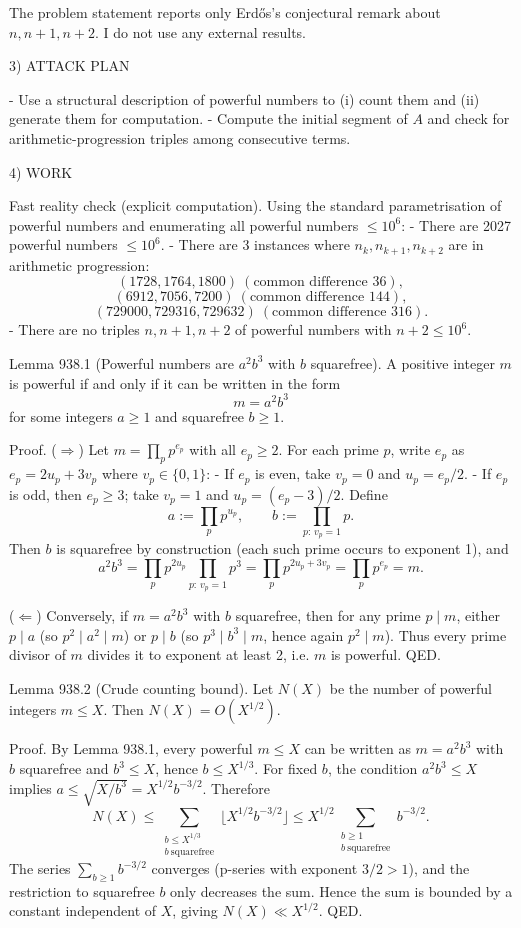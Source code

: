 The problem statement reports only Erd\H{o}s's conjectural remark about \(n,n+1,n+2\). I do not use any external results.

3) ATTACK PLAN

- Use a structural description of powerful numbers to (i) count them and (ii) generate them for computation.
- Compute the initial segment of \(A\) and check for arithmetic-progression triples among consecutive terms.

4) WORK

Fast reality check (explicit computation).
Using the standard parametrisation of powerful numbers and enumerating all powerful numbers \(\le 10^6\):
- There are 2027 powerful numbers \(\le 10^6\).
- There are 3 instances where \(n_k,n_{k+1},n_{k+2}\) are in arithmetic progression:
  \[(1728,1764,1800)\ (\text{common difference }36),\]
  \[(6912,7056,7200)\ (\text{common difference }144),\]
  \[(729000,729316,729632)\ (\text{common difference }316).\]
- There are no triples \(n,n+1,n+2\) of powerful numbers with \(n+2\le 10^6\).

Lemma 938.1 (Powerful numbers are \(a^2 b^3\) with \(b\) squarefree).
A positive integer \(m\) is powerful if and only if it can be written in the form
\[m=a^2 b^3\]
for some integers \(a\ge 1\) and squarefree \(b\ge 1\).

Proof.
(\(\Rightarrow\)) Let \(m=\prod_p p^{e_p}\) with all \(e_p\ge 2\). For each prime \(p\), write \(e_p\) as \(e_p=2u_p+3v_p\) where \(v_p\in\{0,1\}\):
- If \(e_p\) is even, take \(v_p=0\) and \(u_p=e_p/2\).
- If \(e_p\) is odd, then \(e_p\ge 3\); take \(v_p=1\) and \(u_p=(e_p-3)/2\).
Define
\[a:=\prod_p p^{u_p},\qquad b:=\prod_{p:\,v_p=1} p.
\]
Then \(b\) is squarefree by construction (each such prime occurs to exponent 1), and
\[a^2 b^3 = \prod_p p^{2u_p} \prod_{p:\,v_p=1} p^{3} = \prod_p p^{2u_p+3v_p} = \prod_p p^{e_p}=m.
\]

(\(\Leftarrow\)) Conversely, if \(m=a^2 b^3\) with \(b\) squarefree, then for any prime \(p\mid m\), either \(p\mid a\) (so \(p^2\mid a^2\mid m\)) or \(p\mid b\) (so \(p^3\mid b^3\mid m\), hence again \(p^2\mid m\)). Thus every prime divisor of \(m\) divides it to exponent at least 2, i.e. \(m\) is powerful.
QED.

Lemma 938.2 (Crude counting bound).
Let \(N(X)\) be the number of powerful integers \(m\le X\). Then \(N(X)=O(X^{1/2})\).

Proof.
By Lemma 938.1, every powerful \(m\le X\) can be written as \(m=a^2 b^3\) with \(b\) squarefree and \(b^3\le X\), hence \(b\le X^{1/3}\).
For fixed \(b\), the condition \(a^2 b^3\le X\) implies \(a\le \sqrt{X/b^3}=X^{1/2} b^{-3/2}\). Therefore
\[N(X) \le \sum_{\substack{b\le X^{1/3}\\ b\ \mathrm{squarefree}}} \Big\lfloor X^{1/2} b^{-3/2}\Big\rfloor
\le X^{1/2} \sum_{\substack{b\ge 1\\ b\ \mathrm{squarefree}}} b^{-3/2}.
\]
The series \(\sum_{b\ge 1} b^{-3/2}\) converges (p-series with exponent \(3/2>1\)), and the restriction to squarefree \(b\) only decreases the sum. Hence the sum is bounded by a constant independent of \(X\), giving \(N(X)\ll X^{1/2}\). QED.

